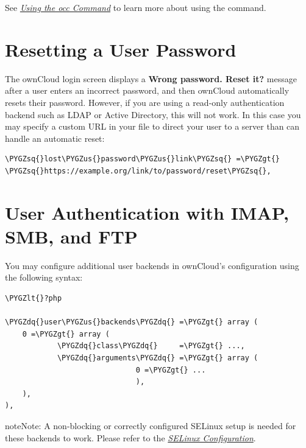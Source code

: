 \documentclass[letterpaper,10pt,english]{sphinxmanual}
\def\PYGZus{\char`\_}
\def\PYGZlt{\char`\<}
\def\PYGZgt{\char`\>}
\def\PYGZsq{\char`\'}
\def\PYGZdq{\char`\"}
\begin{document}
See {\hyperref[configuration_server/occ_command::doc]{\emph{Using the occ Command}}} to learn more about using the
 command.


\section{Resetting a User Password}
\label{configuration_user/reset_user_password:resetting-a-user-password}\label{configuration_user/reset_user_password::doc}
The ownCloud login screen displays a \textbf{Wrong password. Reset it?} message
after a user enters an incorrect password, and then ownCloud automatically
resets their password. However, if you are using a read-only authentication
backend such as LDAP or Active Directory, this will not work. In this case you
may specify a custom URL in your  file to direct your user to a
server than can handle an automatic reset:

\begin{Verbatim}[commandchars=\\\{\}]
\PYGZsq{}lost\PYGZus{}password\PYGZus{}link\PYGZsq{} =\PYGZgt{} \PYGZsq{}https://example.org/link/to/password/reset\PYGZsq{},
\end{Verbatim}


\section{User Authentication with IMAP, SMB, and FTP}
\label{configuration_user/user_auth_ftp_smb_imap:user-authentication-with-imap-smb-and-ftp}\label{configuration_user/user_auth_ftp_smb_imap::doc}
You may configure additional user backends
in ownCloud's configuration  using the following
syntax:

\begin{Verbatim}[commandchars=\\\{\}]
\PYGZlt{}?php

\PYGZdq{}user\PYGZus{}backends\PYGZdq{} =\PYGZgt{} array (
    0 =\PYGZgt{} array (
            \PYGZdq{}class\PYGZdq{}     =\PYGZgt{} ...,
            \PYGZdq{}arguments\PYGZdq{} =\PYGZgt{} array (
                              0 =\PYGZgt{} ...
                              ),
    ),
),
\end{Verbatim}

\begin{notice}{note}{Note:}
A non-blocking or correctly configured SELinux setup is needed
for these backends to work. Please refer to the {\hyperref[installation/selinux_configuration:selinux-config-label]{\emph{SELinux Configuration}}}.
\end{notice}
\end{document}
